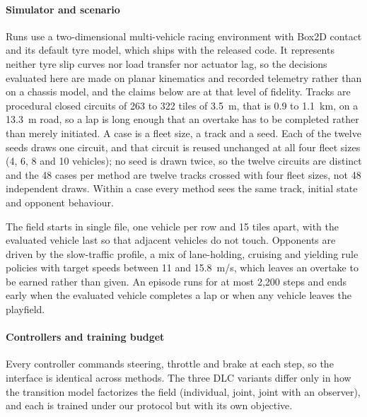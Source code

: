 \documentclass[journal]{IEEEtran}
\begin{document}
\paragraph{Simulator and scenario}
Runs use a two-dimensional multi-vehicle racing environment with Box2D contact
and its default tyre model, which ships with the released code. It represents
neither tyre slip curves nor load
transfer nor actuator lag, so the decisions evaluated here are made on planar
kinematics and recorded telemetry rather than on a chassis model, and the claims
below are at that level of fidelity. Tracks are procedural closed circuits of 263 to 322
tiles of 3.5~m, that is 0.9 to 1.1~km, on a 13.3~m road, so a lap is long enough
that an overtake has to be completed rather than merely initiated. A case is a
fleet size, a track and a seed. Each of the twelve seeds draws one circuit, and
that circuit is reused unchanged at all four fleet sizes (4, 6, 8 and 10
vehicles); no seed is drawn twice, so the twelve circuits are distinct and the
48 cases per method are twelve tracks crossed with four fleet sizes, not 48
independent draws. Within a case every method sees the same track, initial state
and opponent behaviour.

The field starts in single file, one vehicle per row and 15 tiles apart, with
the evaluated vehicle last so that adjacent vehicles do not touch.
Opponents are driven by the
slow-traffic profile, a mix of lane-holding, cruising and yielding rule policies
with target speeds between 11 and 15.8~m/s, which leaves an overtake to be
earned rather than given. An episode runs for at most 2{,}200 steps and ends
early when the evaluated vehicle completes a lap or when any vehicle leaves the
playfield.

\paragraph{Controllers and training budget}
Every controller commands steering, throttle and brake at each step, so the
interface is identical across methods. The
three DLC variants differ only in how the transition model factorizes the field
(individual, joint, joint with an observer), and each is trained under our
protocol but with its own objective.
\end{document}
